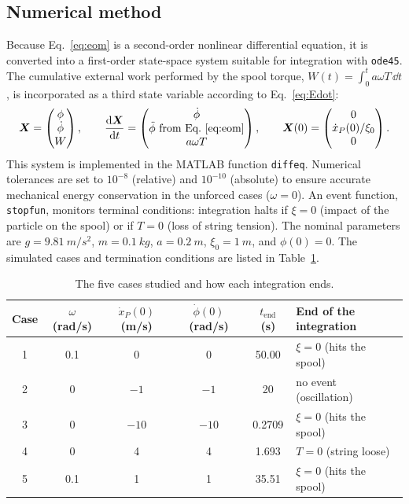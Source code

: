 \documentclass[11pt,a4paper]{article}
\newcommand{\dt}[1]{\dot{#1}}
\newcommand{\ddt}[1]{\ddot{#1}}
\begin{document}
\subsection{Numerical method}
Because Eq.~\eqref{eq:eom} is a second-order nonlinear differential equation, it is converted into a first-order state-space system suitable for integration with \texttt{ode45}. The cumulative external work performed by the spool torque, $W(t)=\int_0^t a\omega T\,\dd t$, is incorporated as a third state variable according to Eq.~\eqref{eq:Edot}:
\begin{equation}
\bm X=\begin{pmatrix}\phi\\ \dt\phi\\ W\end{pmatrix},\qquad
\frac{\dd\bm X}{\dd t}=\begin{pmatrix}\dt\phi\\ \ddt\phi \text{ from Eq.~\eqref{eq:eom}}\\ a\omega T\end{pmatrix},\qquad
\bm X(0)=\begin{pmatrix}0\\ \dt x_P(0)/\xi_0\\ 0\end{pmatrix}.
\label{eq:system}
\end{equation}
This system is implemented in the MATLAB function \texttt{diffeq}. Numerical tolerances are set to $10^{-8}$ (relative) and $10^{-10}$ (absolute) to ensure accurate mechanical energy conservation in the unforced cases ($\omega=0$). An event function, \texttt{stopfun}, monitors terminal conditions: integration halts if $\xi=0$ (impact of the particle on the spool) or if $T=0$ (loss of string tension). The nominal parameters are $g=\SI{9.81}{m/s^2}$, $m=\SI{0.1}{kg}$, $a=\SI{0.2}{m}$, $\xi_0=\SI{1}{m}$, and $\phi(0)=0$. The simulated cases and termination conditions are listed in Table~\ref{tab:cases}.
\begin{table}[htbp]
\centering
\caption{The five cases studied and how each integration ends.}\label{tab:cases}
\begin{tabular}{cccccl}
\toprule
Case & $\omega$ (rad/s) & $\dt x_P(0)$ (m/s) & $\dt\phi(0)$ (rad/s) & $t_{\text{end}}$ (s) & End of the integration\\
\midrule
1 & 0.1 & 0 & 0 & 50.00 & $\xi=0$ (hits the spool)\\
2 & 0 & $-1$ & $-1$ & 20 & no event (oscillation)\\
3 & 0 & $-10$ & $-10$ & 0.2709 & $\xi=0$ (hits the spool)\\
4 & 0 & 4 & 4 & 1.693 & $T=0$ (string loose)\\
5 & 0.1 & 1 & 1 & 35.51 & $\xi=0$ (hits the spool)\\
\bottomrule
\end{tabular}
\end{table}
\end{document}
